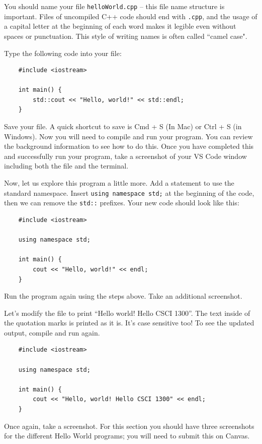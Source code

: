 You should name your file \texttt{helloWorld.cpp} -- this file name structure is important. Files of uncompiled C++ code should end with \texttt{.cpp}, and the usage of a capital letter at the beginning of each word makes it legible even without spaces or punctuation. This style of writing names is often called ``camel case". 

Type the following code into your file:

\begin{verbatim}
    #include <iostream>

    int main() {
        std::cout << "Hello, world!" << std::endl;
    }
\end{verbatim}

Save your file.  A quick shortcut to save is Cmd + S (In Mac) or Ctrl + S (in Windows). Now you will need to compile and run your program. You can review the background information to see how to do this. Once you have completed this and successfully run your program, take a screenshot of your VS Code window including both the file and the terminal. 

Now, let us explore this program a little more. Add a statement to use the standard namespace. Insert \texttt{using namespace std;} at the beginning of the code, then we can remove the \texttt{std::} prefixes. Your new code should look like this:

\begin{verbatim}
    #include <iostream>

    using namespace std;
    
    int main() {
        cout << "Hello, world!" << endl;
    }
\end{verbatim}

Run the program again using the steps above. Take an additional screenshot.

Let’s modify the file to print ``Hello world! Hello CSCI 1300”. The text inside of the quotation marks is printed as it is. It’s case sensitive too! To see the updated output, compile and run again.

\begin{verbatim}
    #include <iostream>

    using namespace std;
    
    int main() {
        cout << "Hello, world! Hello CSCI 1300" << endl;
    }
\end{verbatim}

Once again, take a screenshot. For this section you should have three screenshots for the different Hello World programs; you will need to submit this on Canvas. 

